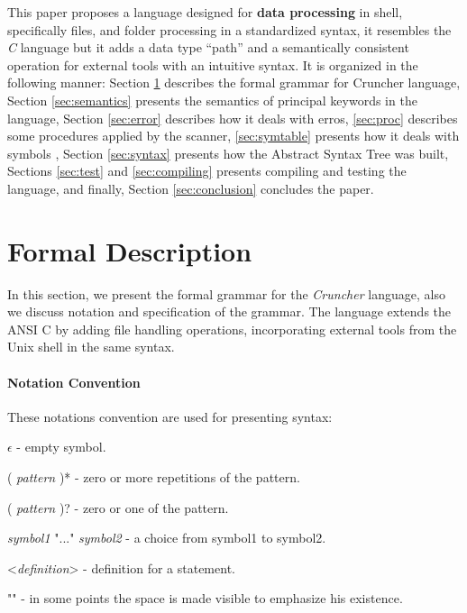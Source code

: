 \documentclass{article}
\begin{document}
This paper proposes a language designed for \textbf{data processing} in shell,
specifically files, and folder processing in a standardized syntax, it
resembles the \textit{C} language but it adds a data type ``path'' and a
semantically consistent operation for external tools with an intuitive syntax.
It is organized in the following manner: Section \ref{sec:formal} describes the
formal grammar for Cruncher language, Section \ref{sec:semantics} presents the
semantics of principal keywords in the language, Section \ref{sec:error}
describes how it deals with erros, \ref{sec:proc} describes some procedures
applied by the scanner, \ref{sec:symtable} presents how it deals with
symbols , Section \ref{sec:syntax} presents how the Abstract Syntax Tree was
built, Sections \ref{sec:test} and \ref{sec:compiling} presents compiling and
testing the language, and finally, Section \ref{sec:conclusion} concludes the
paper.

\section{Formal Description}
\label{sec:formal}
In this section, we present the formal grammar for the \textit{Cruncher}
language, also we discuss notation and specification of the grammar. The
language extends the ANSI C \cite{kernighan2006c} by adding file handling
operations, incorporating external tools from the Unix shell in the same
syntax.

\paragraph{Notation Convention}
These notations convention are used for presenting syntax:

\begin{grammar}
\item $\epsilon$ - empty symbol.

\item ( \textit{pattern} )* - zero or more repetitions of the pattern.

\item ( \textit{pattern} )? - zero or one of the pattern.

\item \textit{symbol1} "..." \textit{symbol2} - a choice from symbol1 to symbol2.

\item <\textit{definition}> - definition for a statement.

\item "\textvisiblespace" - in some points the space is made visible to
    emphasize his existence.
\end{grammar}
\end{document}

